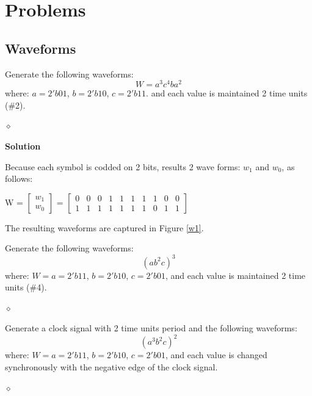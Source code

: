 \section{Problems}


\subsection{Waveforms}

\begin{problem}
Generate the following waveforms:
$$W = a^3c^4ba^2$$
where: $a = 2'b01$, $b = 2'b10$, $c = 2'b11$. and each value is maintained 2 time units (\#2).

$\diamond$
\end{problem}

{\bf Solution}

Because each symbol is codded on 2 bits, results 2 wave forms: $w_1$ and $w_0$, as follows:

W =
$\begin{bmatrix}
w_1 \\
w_0
\end{bmatrix}$
=
$\begin{bmatrix}
0 & 0 & 0 & 1 & 1 & 1 & 1 & 1 & 0 & 0\\
1 & 1 & 1 & 1 & 1 & 1 & 1 & 0 & 1 & 1
\end{bmatrix}$

                    
The resulting waveforms are captured in Figure \ref{w1}.



\begin{problem}
Generate the following waveforms:
$$(ab^2c)^3$$
where: $W = a = 2'b11$, $b = 2'b10$, $c = 2'b01$,  and each value is maintained 2 time units (\#4).

$\diamond$
\end{problem}


\begin{problem}
Generate a clock signal with 2 time units period and the following waveforms:
$$(a^3b^2c)^2$$
where: $W = a = 2'b11$, $b = 2'b10$, $c = 2'b01$,  and each value is changed synchronously with the negative edge of the clock signal.

$\diamond$
\end{problem}


